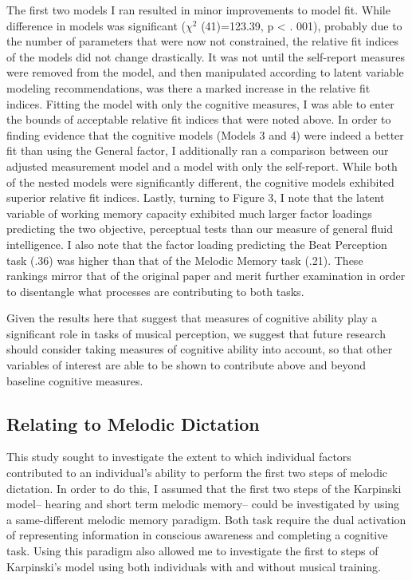 \documentclass[]{book}
\begin{document}
The first two models I ran resulted in minor improvements to model fit.
While difference in models was significant (\(\chi^2\) (41)=123.39, p \textless{} . 001), probably due to the number of parameters that were now not constrained, the relative fit indices of the models did not change drastically.
It was not until the self-report measures were removed from the model, and then manipulated according to latent variable modeling recommendations, was there a marked increase in the relative fit indices.
Fitting the model with only the cognitive measures, I was able to enter the bounds of acceptable relative fit indices that were noted above.
In order to finding evidence that the cognitive models (Models 3 and 4) were indeed a better fit than using the General factor, I additionally ran a comparison between our adjusted measurement model and a model with only the self-report.
While both of the nested models were significantly different, the cognitive models exhibited superior relative fit indices.
Lastly, turning to Figure 3, I note that the latent variable of working memory capacity exhibited much larger factor loadings predicting the two objective, perceptual tests than our measure of general fluid intelligence.
I also note that the factor loading predicting the Beat Perception task (.36) was higher than that of the Melodic Memory task (.21).
These rankings mirror that of the original \citep{mullensiefenMusicalityNonMusiciansIndex2014} paper and merit further examination in order to disentangle what processes are contributing to both tasks.

Given the results here that suggest that measures of cognitive ability play a significant role in tasks of musical perception, we suggest that future research should consider taking measures of cognitive ability into account, so that other variables of interest are able to be shown to contribute above and beyond baseline cognitive measures.

\hypertarget{relating-to-melodic-dictation}{%
\subsection{Relating to Melodic Dictation}\label{relating-to-melodic-dictation}}

This study sought to investigate the extent to which individual factors contributed to an individual's ability to perform the first two steps of melodic dictation.
In order to do this, I assumed that the first two steps of the Karpinski model-- hearing and short term melodic memory-- could be investigated by using a same-different melodic memory paradigm.
Both task require the dual activation of representing information in conscious awareness and completing a cognitive task.
Using this paradigm also allowed me to investigate the first to steps of Karpinski's model using both individuals with and without musical training.
\end{document}
